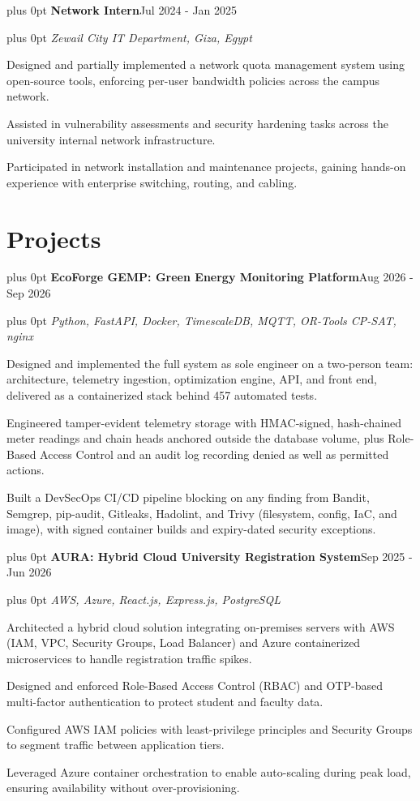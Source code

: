 \documentclass[10pt,letterpaper]{article}
\newcommand{\headerrow}[2]{%
  \begingroup\rightskip=0pt plus 0pt\relax
  #1\hfill #2\par\endgroup}
\newcommand{\entry}[4]{%
  \headerrow{\textbf{#1}}{#2}%
  \headerrow{\textit{#3}}{\textit{#4}}%
  \vspace{0.1em}}
\begin{document}
\entry{Network Intern}{Jul 2024 - Jan 2025}
      {Zewail City IT Department, Giza, Egypt}{}
\begin{tight}
  \item Designed and partially implemented a network quota management system using open-source tools, enforcing per-user bandwidth policies across the campus network.
  \item Assisted in vulnerability assessments and security hardening tasks across the university internal network infrastructure.
  \item Participated in network installation and maintenance projects, gaining hands-on experience with enterprise switching, routing, and cabling.
\end{tight}

\section*{Projects}

\entry{EcoForge GEMP: Green Energy Monitoring Platform}{Aug 2026 - Sep 2026}
      {Python, FastAPI, Docker, TimescaleDB, MQTT, OR-Tools CP-SAT, nginx}{}
\begin{tight}
  \item Designed and implemented the full system as sole engineer on a two-person team: architecture, telemetry ingestion, optimization engine, API, and front end, delivered as a containerized stack behind 457 automated tests.
  \item Engineered tamper-evident telemetry storage with HMAC-signed, hash-chained meter readings and chain heads anchored outside the database volume, plus Role-Based Access Control and an audit log recording denied as well as permitted actions.
  \item Built a DevSecOps CI/CD pipeline blocking on any finding from Bandit, Semgrep, pip-audit, Gitleaks, Hadolint, and Trivy (filesystem, config, IaC, and image), with signed container builds and expiry-dated security exceptions.
\end{tight}
\vspace{0.22em}

\entry{AURA: Hybrid Cloud University Registration System}{Sep 2025 - Jun 2026}
      {AWS, Azure, React.js, Express.js, PostgreSQL}{}
\begin{tight}
  \item Architected a hybrid cloud solution integrating on-premises servers with AWS (IAM, VPC, Security Groups, Load Balancer) and Azure containerized microservices to handle registration traffic spikes.
  \item Designed and enforced Role-Based Access Control (RBAC) and OTP-based multi-factor authentication to protect student and faculty data.
  \item Configured AWS IAM policies with least-privilege principles and Security Groups to segment traffic between application tiers.
  \item Leveraged Azure container orchestration to enable auto-scaling during peak load, ensuring availability without over-provisioning.
\end{tight}
\vspace{0.22em}
\end{document}
